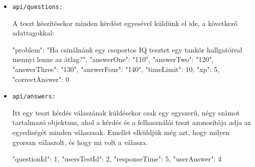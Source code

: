 \newpage


\begin{itemize}[label={$\bullet$}, topsep=0pt, itemsep=0pt, leftmargin=15pt]
    \item[] {\nolinkurl{api/questions:}}
          \begin{addmargin}[\parindent]{0pt}
              A teszt készítésekor minden kérdést egyesével küldünk el ide, a következő adattagokkal:
              \begin{json}
{
    "problem": "Ha csinálnánk egy csoportos IQ tesztet egy tankör hallgatóival mennyi lenne az átlag?",
    "answerOne": "110",
    "answerTwo": "120",
    "answerThree": "130",
    "answerFour": "140",
    "timeLimit": 10,
    "xp": 5,
    "correctAnswer": 0
}
              \end{json}
          \end{addmargin}
\end{itemize}


\begin{itemize}[label={$\bullet$}, topsep=0pt, itemsep=0pt, leftmargin=15pt]
    \item[] {\nolinkurl{api/answers:}}
          \begin{addmargin}[\parindent]{0pt}
              Itt egy teszt kérdés válaszának küldésekor csak egy egyszerű, négy számot tartalmazó objektum, ahol a kérdés és a felhasználói teszt azonosítója adja az egyediségét minden válasznak. Emellet elküldjük még azt, hogy milyen gyorsan válaszolt, és hogy mi volt a válasza.

              \begin{json}
{
    "questionId": 1,
    "usersTestId": 2,
    "responseTime": 5,
    "userAnswer": 4
}
              \end{json}
          \end{addmargin}
\end{itemize}


